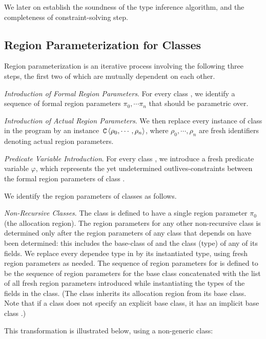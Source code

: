 We later on establish the soundness of the type inference algorithm,
and the completeness of constraint-solving step.

\subsection{Region Parameterization for Classes}
\label{sec:fb-templatization}

Region parameterization is an iterative process involving the following three steps,
the first two of which are mutually dependent on each other.

\emph{Introduction of Formal Region Parameters}.
For every class , we identify a sequence of formal region parameters
$\pi_0, \cdots \pi_n$ that  should be parametric over.

\emph{Introduction of Actual Region Parameters}.
We then replace every instance of class  in the program by an instance
$\,{\tt C}\,\langle \rho_0, \cdots, \rho_n \rangle$, where $\rho_0, \cdots, \rho_n$
are fresh identifiers denoting actual region parameters.

\emph{Predicate Variable Introduction}. For every class , we introduce
a fresh predicate variable $\varphi$, which represents the yet undetermined
outlives-constraints between the formal region parameters of class .

We identify the region parameters of classes as follows.

\emph{Non-Recursive Classes}.
The class  is defined to have a single region parameter $\pi_0$ (the allocation region).
The region parameters for any other non-recursive class  is determined
only after the region parameters of any class that  depends on have been
determined: this includes the base-class  of  and the class (type)
of any of its fields.
We replace every dependee type  in  by its instantiated type,
using fresh region parameters as needed.
The sequence of region parameters for  is defined to be
the sequence of region parameters for the base class  concatenated
with the list of all  fresh region parameters introduced while instantiating the types
of the fields in the class.
(The class inherits its allocation region from its base class. Note that if
a class does not specify an explicit base class, it has an implicit base class
.)

This transformation is illustrated below, using a non-generic  class:

